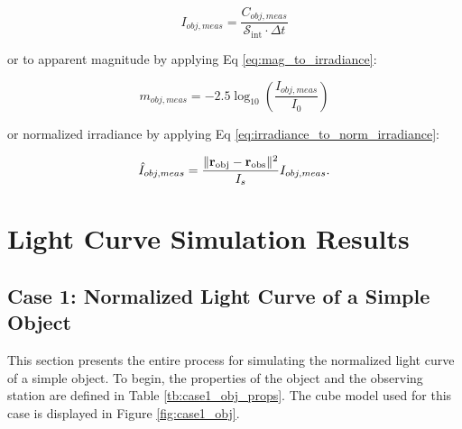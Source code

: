 \begin{equation} \label{eq:noisy_counts_to_irrad}
  I_{obj,meas} = \frac{C_{obj,meas}}{\mathrm{\mathcal{S}_\mathrm{int}} \cdot \Delta t}
\end{equation}

or to apparent magnitude by applying Eq \ref{eq:mag_to_irradiance}:

\begin{equation}
  m_{obj,meas} = -2.5 \log_{10}\left( \frac{I_{obj,meas}}{I_0} \right)
\end{equation}

or normalized irradiance by applying Eq \ref{eq:irradiance_to_norm_irradiance}:

\begin{equation} \label{eq:ihat_meas}
  \hat{I}_{obj,meas} = \frac{\| \mathbf{r}_\mathrm{obj} - \mathbf{r}_\mathrm{obs} \|^2}{I_s} I_{obj,meas}.
\end{equation}

\section{Light Curve Simulation Results}

\subsection{Case 1: Normalized Light Curve of a Simple Object}

This section presents the entire process for simulating the normalized light curve of a simple object. To begin, the properties of the object and the observing station are defined in Table \ref{tb:case1_obj_props}. The cube model used for this case is displayed in Figure \ref{fig:case1_obj}.

